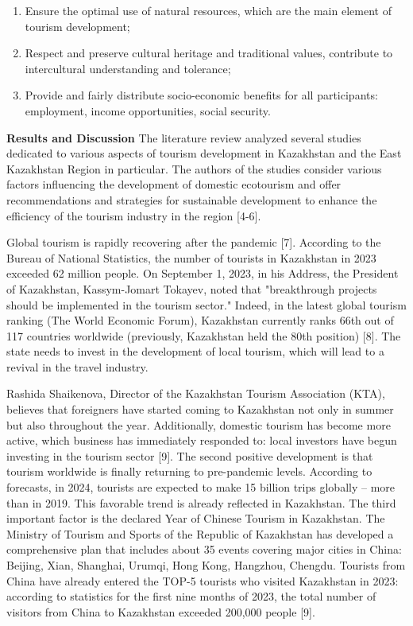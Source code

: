\begin{multicols}{2}
\begin{enumerate}
\def\labelenumi{\arabic{enumi})}
\item
  Ensure the optimal use of natural resources, which are the main
  element of tourism development;
\item
  Respect and preserve cultural heritage and traditional values,
  contribute to intercultural understanding and tolerance;
\item
  Provide and fairly distribute socio-economic benefits for all
  participants: employment, income opportunities, social security.
\end{enumerate}

{\bfseries Results and Discussion} The literature review analyzed several
studies dedicated to various aspects of tourism development in
Kazakhstan and the East Kazakhstan Region in particular. The authors of
the studies consider various factors influencing the development of
domestic ecotourism and offer recommendations and strategies for
sustainable development to enhance the efficiency of the tourism
industry in the region {[}4-6{]}.

Global tourism is rapidly recovering after the pandemic {[}7{]}.
According to the Bureau of National Statistics, the number of tourists
in Kazakhstan in 2023 exceeded 62 million people. On September 1, 2023,
in his Address, the President of Kazakhstan, Kassym-Jomart Tokayev,
noted that "breakthrough projects should be implemented in the tourism
sector." Indeed, in the latest global tourism ranking (The World
Economic Forum), Kazakhstan currently ranks 66th out of 117 countries
worldwide (previously, Kazakhstan held the 80th position) {[}8{]}. The
state needs to invest in the development of local tourism, which will
lead to a revival in the travel industry.

Rashida Shaikenova, Director of the Kazakhstan Tourism Association
(KTA), believes that foreigners have started coming to Kazakhstan not
only in summer but also throughout the year. Additionally, domestic
tourism has become more active, which business has immediately responded
to: local investors have begun investing in the tourism sector {[}9{]}.
The second positive development is that tourism worldwide is finally
returning to pre-pandemic levels. According to forecasts, in 2024,
tourists are expected to make 15 billion trips globally -- more than in
2019. This favorable trend is already reflected in Kazakhstan. The third
important factor is the declared Year of Chinese Tourism in Kazakhstan.
The Ministry of Tourism and Sports of the Republic of Kazakhstan has
developed a comprehensive plan that includes about 35 events covering
major cities in China: Beijing, Xi\textquotesingle an, Shanghai, Urumqi,
Hong Kong, Hangzhou, Chengdu. Tourists from China have already entered
the TOP-5 tourists who visited Kazakhstan in 2023: according to
statistics for the first nine months of 2023, the total number of
visitors from China to Kazakhstan exceeded 200,000 people {[}9{]}.


\end{multicols}
